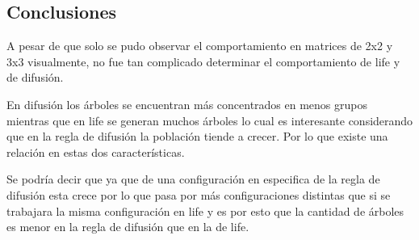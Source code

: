 \subsection{Conclusiones}
	A pesar de que solo se pudo observar el comportamiento en matrices de 2x2 y 3x3 visualmente, no fue tan complicado determinar el comportamiento de life y de difusión.

	En difusión los árboles se encuentran más concentrados en menos grupos mientras que en life se generan muchos árboles lo cual es interesante considerando que en la regla de difusión la población tiende a crecer. Por lo que existe una relación en estas dos características.

	Se podría decir que ya que de una configuración en especifica de la regla de difusión esta crece por lo que pasa por más configuraciones distintas que si se trabajara la misma configuración en life y es por esto que la cantidad de árboles es menor en la regla de difusión que en la de life.